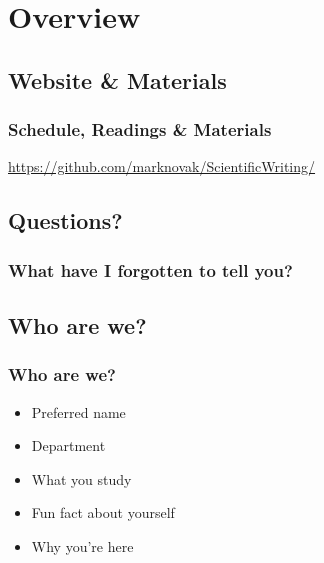 \documentclass{beamer}
\begin{document}
\section{Overview}



\subsection{Website \& Materials}

\begin{frame}
    \frametitle{Schedule, Readings \& Materials}
    \small{    \url{https://github.com/marknovak/ScientificWriting/} }

\end{frame}


\subsection{Questions?}

\begin{frame}
    \frametitle{What have I forgotten to tell you?}

\end{frame}


\subsection{Who are we?}

\begin{frame}
    \frametitle{Who are we?}

    \bigskip
    \begin{itemize}
        \item Preferred name
        \item Department
        \item What you study
        \item Fun fact about yourself
        \item Why you're here
    \end{itemize}


\end{frame}

\end{document}
